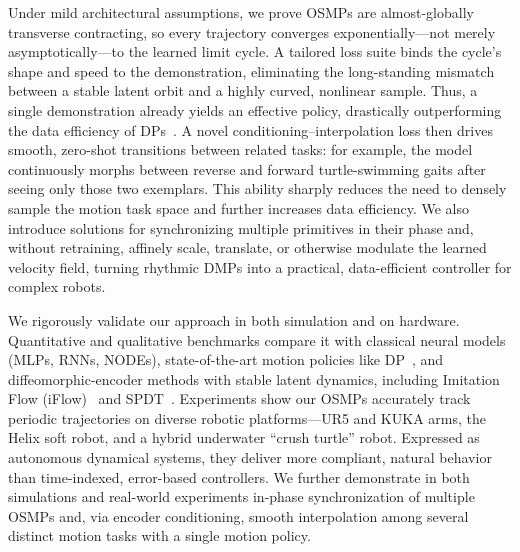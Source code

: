 Under mild architectural assumptions, we prove \glspl{OSMP} are almost-globally transverse contracting, so every trajectory converges exponentially—not merely asymptotically—to the learned limit cycle. A tailored loss suite binds the cycle’s shape and speed to the demonstration, eliminating the long-standing mismatch between a stable latent orbit and a highly curved, nonlinear sample. Thus, a single demonstration already yields an effective policy, drastically outperforming the data efficiency of \glspl{DP}~\citep{chi2023diffusion}. 
A novel conditioning–interpolation loss then drives smooth, zero-shot transitions between related tasks: for example, the model continuously morphs between reverse and forward turtle-swimming gaits after seeing only those two exemplars. This ability sharply reduces the need to densely sample the motion task space and further increases data efficiency. 
We also introduce solutions for synchronizing multiple primitives in their phase and, without retraining, affinely scale, translate, or otherwise modulate the learned velocity field, turning rhythmic \glspl{DMP} into a practical, data-efficient controller for complex robots.

We rigorously validate our approach in both simulation and on hardware. Quantitative and qualitative benchmarks compare it with classical neural models (\glspl{MLP}, \glspl{RNN}, \glspl{NODE}), state-of-the-art motion policies like \gls{DP}~\citep{chi2023diffusion}, and diffeomorphic-encoder methods with stable latent dynamics, including Imitation Flow (iFlow)~\citep{urain2020imitationflow} and \gls{SPDT}~\citep{zhi2024teaching}. Experiments show our \glspl{OSMP} accurately track periodic trajectories on diverse robotic platforms—UR5 and KUKA arms, the Helix soft robot, and a hybrid underwater “crush turtle” robot. Expressed as autonomous dynamical systems, they deliver more compliant, natural behavior than time-indexed, error-based controllers. We further demonstrate in both simulations and real-world experiments in-phase synchronization of multiple \glspl{OSMP} and, via encoder conditioning, smooth interpolation among several distinct motion tasks with a single motion policy.

